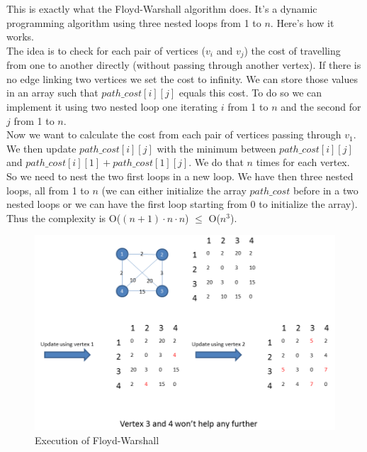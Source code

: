This is exactly what the Floyd-Warshall algorithm does. It's a dynamic programming algorithm using three nested loops from 1 to $n$. Here's how it works.\\

The idea is to check for each pair of vertices ($v_i$ and $v_j$) the cost of travelling from one to another directly (without passing through another vertex). If there is no edge linking two vertices we set the cost to infinity. We can store those values in an array such that $path\_cost[i][j]$ equals this cost. To do so we can implement it using two nested loop one iterating $i$ from 1 to $n$ and the second for $j$ from 1 to $n$.\\
Now we want to calculate the cost from each pair of vertices passing through $v_1$. We then update $path\_cost[i][j]$ with the minimum between $path\_cost[i][j]$ and $path\_cost[i][1]+path\_cost[1][j]$. We do that $n$ times for each vertex. So we need to nest the two first loops in a new loop. We have then three nested loops, all from 1 to $n$ (we can either initialize the array $path\_cost$ before in a two nested loops or we can have the first loop starting from 0 to initialize the array). Thus the complexity is O($(n+1)\cdot n\cdot n$) $\leq$ O($n^3$).\\
\begin{figure}[ht]
  \centering
  \includegraphics[width=1\textwidth]{q1}
  \caption{Execution of Floyd-Warshall}
  \label{fig:q2}
\end{figure}
\clearpage